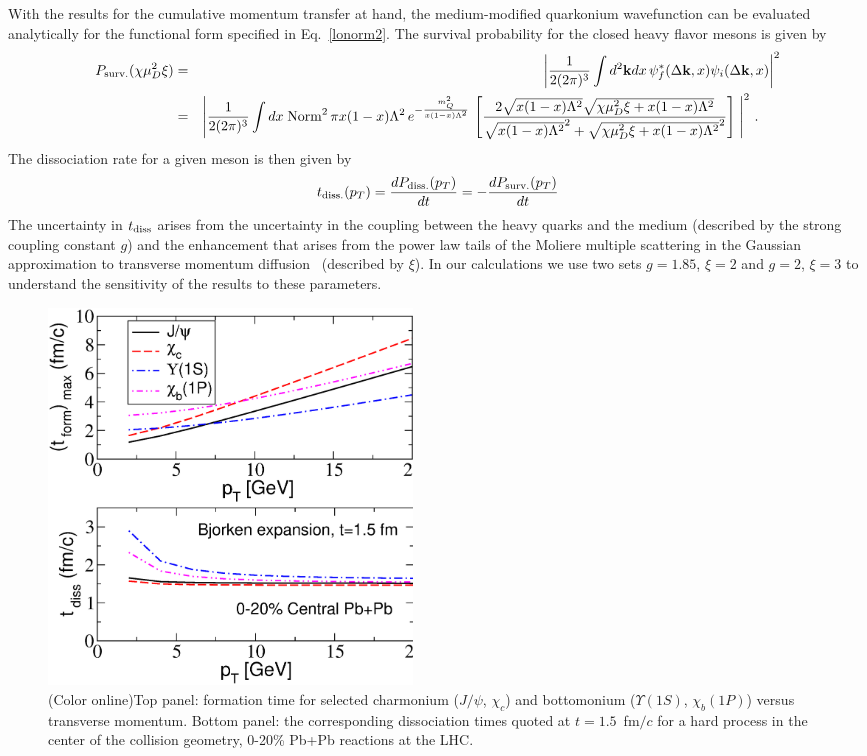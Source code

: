 \documentclass[article,showpacs,preprintnumbers,amsmath,amssymb]{revtex4}
\newcommand{\rd}{{\rm diss}}
\begin{document}
With the results for the cumulative momentum transfer at hand, the medium-modified  quarkonium wavefunction 
can be evaluated analytically for the functional form specified in
Eq.~\ref{lonorm2}.  The survival probability for the
closed heavy flavor mesons is given by
\begin{eqnarray}
  P_{\rm surv.} (\chi\mu_D^2 \xi) & = & \left|  \frac{1}{2 (2\pi)^{3} }  \int d^{2}{\bf k} dx \,
\psi_{f}^* (\Delta {\bf k},x)\psi_{i}(\Delta {\bf k}, x) \right|^{2} 
\nonumber \\
&=& \left| \frac{1}{2 (2\pi)^{3} }  \int dx \; {\rm Norm}^2 \, \pi x(1-x) \Lambda^2
\,  e^{-\frac{ m_{Q}^{2} }{ x(1-x)\Lambda^{2} } } 
\, \left[ \frac{ 2 \sqrt{ x(1-x)\Lambda^{2}}
\sqrt{\chi\mu_D^{2}\xi+x(1-x)\Lambda^{2}} }
{ \sqrt{x(1-x)\Lambda^{2}}^{2}  + \sqrt{\chi\mu_D^{2}\xi+x(1-x)
\Lambda^{2}}^2 } \right] \; \right|^2 \, . \;\; \quad 
\label{sprob}
\end{eqnarray}
The dissociation rate for a given meson is then given by
\begin{equation}
t_{\rm diss.}(p_T) = \frac{d P_{\rm diss.}(p_T)}{dt} = - \frac{d P_{\rm surv.}(p_T)}{dt} 
\end{equation}
The uncertainty in $t_\rd$ arises from the uncertainty in the coupling between the heavy
quarks and the medium (described by the strong coupling constant $g$)  and
the enhancement that arises from the power law tails of the Moliere
multiple scattering in the Gaussian approximation to transverse momentum 
diffusion~\cite{hep-ph/0611109}
(described by $\xi$).  In our calculations we use two sets 
$g=1.85$, $\xi=2$ and $g=2$, $\xi=3$ to understand the sensitivity of the
results to these parameters.

\begin{figure}[!ht]
\vspace*{.2in} 
\includegraphics[width=3.80in,angle=0]{fig32_times.eps} 
\caption{(Color online)Top panel: formation time for selected charmonium
($J/\psi$, $\chi_c$) and bottomonium ($\Upsilon(1S)$, $\chi_b(1P)$) versus
transverse momentum.  Bottom panel: the corresponding dissociation times quoted
at $t=1.5$~fm$/c$ for a hard process in the center of the collision geometry,
0-20\% Pb+Pb reactions at the LHC. \label{fig:Times}} 
\end{figure}
\end{document}
